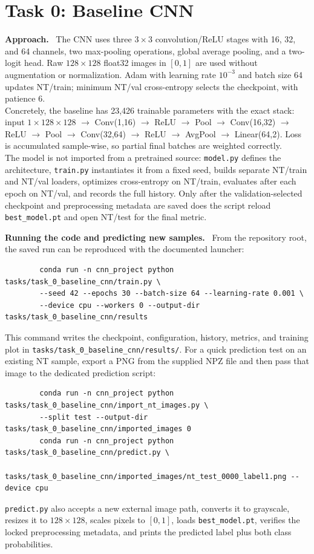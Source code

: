 \documentclass[10pt,a4paper]{article}
\newcommand{\TaskPage}[2]{%
  \clearpage
  \section{Task #1: #2}\label{task:#1:start}%
}
\newcommand{\RunHead}[1]{\par\smallskip\noindent\textbf{#1.}\ }
\begin{document}
\TaskPage{0}{Baseline CNN}

\RunHead{Approach}
The CNN uses three $3\times3$ convolution/ReLU stages with
16, 32, and 64 channels, two max-pooling operations, global average pooling, and a
two-logit head. Raw $128\times128$ float32 images in $[0,1]$ are used without augmentation
or normalization. Adam with learning rate $10^{-3}$ and batch size 64
updates NT/train; minimum NT/val cross-entropy selects the checkpoint, with patience 6.
\\
Concretely, the baseline has 23,426 trainable parameters
with the exact stack:
input \(1\times128\times128\) \(\rightarrow\) Conv(1,16) \(\rightarrow\) ReLU
\(\rightarrow\) Pool \(\rightarrow\) Conv(16,32) \(\rightarrow\) ReLU \(\rightarrow\) Pool
\(\rightarrow\) Conv(32,64) \(\rightarrow\) ReLU \(\rightarrow\) AvgPool
\(\rightarrow\) Linear(64,2).
Loss is accumulated sample-wise, so partial final batches are weighted correctly. 
\\
The model is not imported from a pretrained source: \texttt{model.py} defines the architecture,
\texttt{train.py} instantiates it from a fixed seed, builds separate NT/train and NT/val loaders,
optimizes cross-entropy on NT/train, evaluates after each epoch on NT/val, and records the full
history. Only after the validation-selected checkpoint and preprocessing metadata are saved does
the script reload \texttt{best\_model.pt} and open NT/test for the final metric.

\RunHead{Running the code and predicting new samples}
From the repository root, the saved run can be reproduced with the documented launcher:
\begin{small}
	\begin{verbatim}
		conda run -n cnn_project python tasks/task_0_baseline_cnn/train.py \
		--seed 42 --epochs 30 --batch-size 64 --learning-rate 0.001 \
		--device cpu --workers 0 --output-dir tasks/task_0_baseline_cnn/results
	\end{verbatim}
\end{small}
This command writes the checkpoint, configuration, history, metrics, and training plot in
\nolinkurl{tasks/task_0_baseline_cnn/results/}. For a quick prediction test on an existing NT
sample, export a PNG from the supplied NPZ file and then pass that image to the dedicated
prediction script:
\begin{small}
	\begin{verbatim}
		conda run -n cnn_project python tasks/task_0_baseline_cnn/import_nt_images.py \
		--split test --output-dir tasks/task_0_baseline_cnn/imported_images 0
		conda run -n cnn_project python tasks/task_0_baseline_cnn/predict.py \
		tasks/task_0_baseline_cnn/imported_images/nt_test_0000_label1.png --device cpu
	\end{verbatim}
\end{small}
\texttt{predict.py} also accepts a new external image path, converts it to grayscale, resizes it
to $128\times128$, scales pixels to $[0,1]$, loads \texttt{best\_model.pt}, verifies the locked
preprocessing metadata, and prints the predicted label plus both class probabilities.
\end{document}
